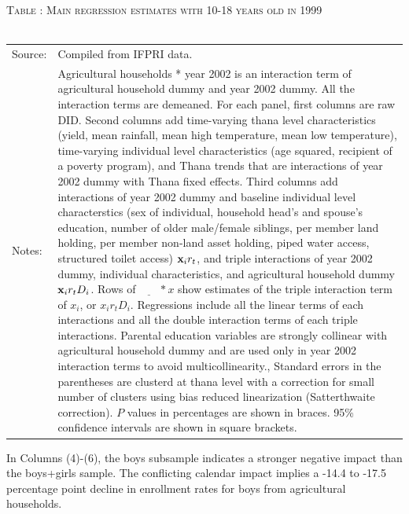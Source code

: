 \documentclass[12pt,letterpaper]{article}\usepackage[margin=1in]{geometry}
\newcommand{\bfx}{\ensuremath{\mbox{\bf x}}}
\newcommand{\0}{\ensuremath{\mbox{\boldmath $0$}}}
\begin{document}
\begin{table}\hfil\textsc{\footnotesize Table \thetable: Main regression estimates with 10-18 years old in 1999\label{base10}}\\\setlength{\tabcolsep}{.5pt}\renewcommand{\arraystretch}{.675}\hspace{-2em}\hfil\\
\renewcommand{\arraystretch}{1}\hfil\begin{tabular}{>{\hfill\scriptsize}p{1cm}<{}>{\scriptsize}p{12cm}<{\hfill}} Source:& Compiled from IFPRI data. \\[-1ex] 
Notes:&  \textsf{Agricultural households * year 2002} is an interaction term of agricultural household dummy and year 2002 dummy. All the interaction terms are demeaned. For each panel, first columns are raw DID. Second columns add time-varying thana level characteristics (yield, mean rainfall, mean high temperature, mean low temperature), time-varying individual level characteristics (age squared, recipient of a poverty program), and \textsf{Thana trends} that are interactions of year 2002 dummy with Thana fixed effects. Third columns add interactions of year 2002 dummy and baseline individual level characterstics (sex of individual, household head's and spouse's education, number of older male/female siblings, per member land holding, per member non-land asset holding, piped water access, structured toilet access) $\bfx_{i}r_{t}$, and triple interactions of year 2002 dummy, individual characteristics, and agricultural household dummy $\bfx_{i}r_{t}D_{i}$.  Rows of $\underline{\phantom{mm}}*x$ show estimates of the triple interaction term of $x_{i}$, or $x_{i}r_{t}D_{i}$. Regressions include all the linear terms of each interactions and all the double interaction terms of each triple interactions. Parental education variables are strongly collinear with agricultural household dummy and are used only in year 2002 interaction terms to avoid multicollinearity.,  Standard errors in the parentheses are clusterd at thana level with a correction for small number of clusters using bias reduced linearization (Satterthwaite correction). $P$ values in percentages are shown in braces. 95\% confidence intervals are shown in square brackets.   
\end{tabular} \end{table}


In Columns (4)-(6), the boys subsample indicates a stronger negative impact than the boys+girls sample. The conflicting calendar impact implies a -14.4 to -17.5 percentage point decline in enrollment rates for boys from agricultural households. 
\end{document}
